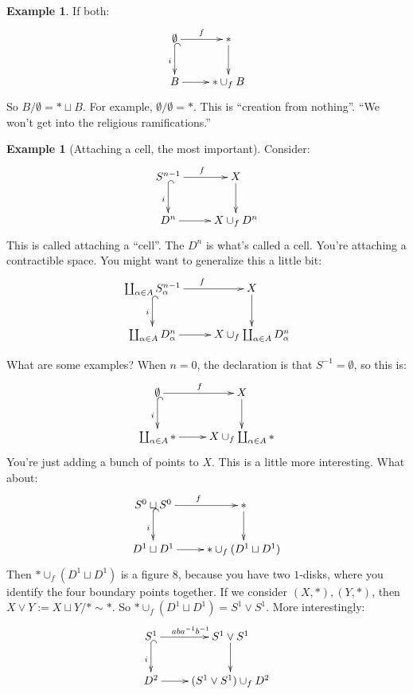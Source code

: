 \documentclass{amsart}
\theoremstyle{theorem}
\theoremstyle{definition}
\newtheorem{example}[theorem]{Example}
\begin{document}
\begin{example}
If both:
\begin{equation*}
\xymatrix{\emptyset\ar[r]^f\ar@{^(->}[d]_i & \ast\ar[d]\\
B\ar[r] & \ast\cup_f B}
\end{equation*}
So $B/\emptyset=\ast\sqcup B$. For example, $\emptyset/\emptyset=\ast$. This is ``creation from nothing''. ``We won't get into the religious ramifications.''
\end{example}
\begin{example}[Attaching a cell, the most important]
Consider:
\begin{equation*}
\xymatrix{S^{n-1}\ar[r]^f\ar@{^(->}[d]_i & X\ar[d]\\
D^n\ar[r] & X\cup_f D^n}
\end{equation*}
This is called attaching a ``cell''. The $D^n$ is what's called a cell. You're attaching a contractible space. You might want to generalize this a little bit:
\begin{equation*}
\xymatrix{\coprod_{\alpha\in A}S^{n-1}_\alpha\ar[r]^f\ar@{^(->}[d]_i & X\ar[d]\\
\coprod_{\alpha\in A}D^n_\alpha\ar[r] & X\cup_f \coprod_{\alpha\in A}D^n_\alpha}
\end{equation*}
\end{example}
What are some examples? When $n=0$, the declaration is that $S^{-1}=\emptyset$, so this is:
\begin{equation*}
\xymatrix{\emptyset\ar[r]^f\ar@{^(->}[d]_i & X\ar[d]\\
\coprod_{\alpha\in A}\ast\ar[r] & X\cup_f \coprod_{\alpha\in A}\ast}
\end{equation*}
You're just adding a bunch of points to $X$. This is a little more interesting. What about:
\begin{equation*}
\xymatrix{S^0\sqcup S^0\ar[r]^f\ar@{^(->}[d]_i & \ast\ar[d]\\
D^1\sqcup D^1\ar[r] & \ast\cup_f (D^1\sqcup D^1)}
\end{equation*}
Then $\ast\cup_f(D^1\sqcup D^1)$ is a figure $8$, because you have two $1$-disks, where you identify the four boundary points together. If we consider $(X,\ast),(Y,\ast)$, then $X\vee Y:= X\sqcup Y/\ast\sim \ast$. So $\ast\cup_f(D^1\sqcup D^1)=S^1\vee S^1$. More interestingly:
\begin{equation*}
\xymatrix{S^1\ar[r]^{aba^{-1}b^{-1}}\ar@{^(->}[d]_i & S^1\vee S^1\ar[d]\\
D^2\ar[r] & (S^1\vee S^1)\cup_f D^2}
\end{equation*}
\end{document}
